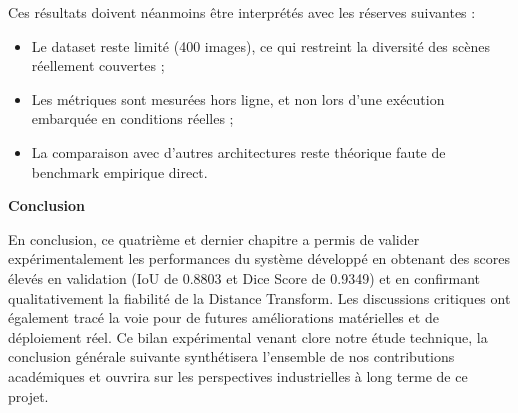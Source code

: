 Ces résultats doivent néanmoins être interprétés avec les réserves suivantes :
\begin{itemize}[leftmargin=1.8em, itemsep=4pt]
  \item[\textcolor{ENIADOrange}{\ding{118}}] Le dataset reste limité (400 images), ce qui restreint la diversité des scènes réellement couvertes ;
  \item[\textcolor{ENIADOrange}{\ding{118}}] Les métriques sont mesurées hors ligne, et non lors d'une exécution embarquée en conditions réelles ;
  \item[\textcolor{ENIADOrange}{\ding{118}}] La comparaison avec d'autres architectures reste théorique faute de benchmark empirique direct.
\end{itemize}

\vspace{1.5em}
\textbf{Conclusion}

En conclusion, ce quatrième et dernier chapitre a permis de valider expérimentalement les performances du système développé en obtenant des scores élevés en validation (IoU de 0.8803 et Dice Score de 0.9349) et en confirmant qualitativement la fiabilité de la Distance Transform. Les discussions critiques ont également tracé la voie pour de futures améliorations matérielles et de déploiement réel. Ce bilan expérimental venant clore notre étude technique, la conclusion générale suivante synthétisera l'ensemble de nos contributions académiques et ouvrira sur les perspectives industrielles à long terme de ce projet.
\clearpage
